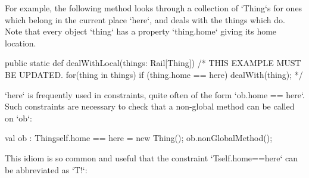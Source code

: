 \begin{example}
For example, the following method looks through a collection of \xcd`Thing`s
for ones which belong in the current place \xcd`here`, and deals with the
things which do.  Note that every object \xcd`thing` has a property
\xcd`thing.home` giving its home location.
\begin{xten}
  public static def dealWithLocal(things: Rail[Thing]) {
/*
     THIS EXAMPLE MUST BE UPDATED.
     for(thing in things) {
    	 if (thing.home == here) 
            dealWith(thing);
     }	  
*/
  }
\end{xten}



\end{example}

\xcd`here` is frequently used in constraints, quite often of the form
\xcd`ob.home == here`. Such constraints are necessary to check that a
non-global method can be called on \xcd`ob`: 


\begin{xten}
val ob : Thing{self.home == here} = new Thing();
ob.nonGlobalMethod();
\end{xten}

This idiom is so common and useful that the constraint
\xcd`T{self.home==here}` can be abbreviated as \xcd`T!`: 

